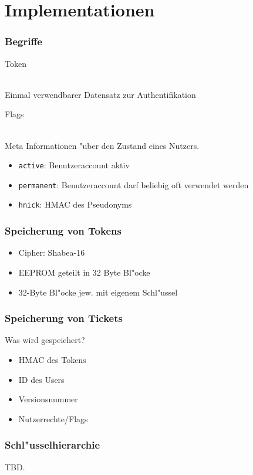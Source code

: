 \section{Implementationen}
\begin{frame}
	\frametitle{Begriffe}
	\begin{large}Token\end{large}
	\\
	Einmal verwendbarer Datensatz zur Authentifikation

	\vspace{1cm}

	\begin{large}Flags\end{large}
	\\
	Meta Informationen "uber den Zustand eines Nutzers.
	\begin{itemize}
		\item \texttt{active}: Benutzeraccount aktiv
		\item \texttt{permanent}: Benutzeraccount darf beliebig oft verwendet werden
		\item \texttt{hnick}: HMAC des Pseudonyms
	\end{itemize}
\end{frame}

\begin{frame}
	\frametitle{Speicherung von Tokens}
	\begin{itemize}
		\item<2-> Cipher: Shabea-16
		\item<3-> EEPROM geteilt in 32 Byte Bl"ocke
		\item<4-> 32-Byte Bl"ocke jew. mit eigenem Schl"ussel
	\end{itemize}
\end{frame}


\begin{frame}
	\frametitle{Speicherung von Tickets}
	Was wird gespeichert?
	\begin{itemize}
		\item<2-> HMAC des Tokens
		\item<3-> ID des Users
		\item<4-> Versionsnummer
		\item<5-> Nutzerrechte/Flags
	\end{itemize}
\end{frame}

\begin{frame}
	\frametitle{Schl"usselhierarchie}
	TBD.
\end{frame}

